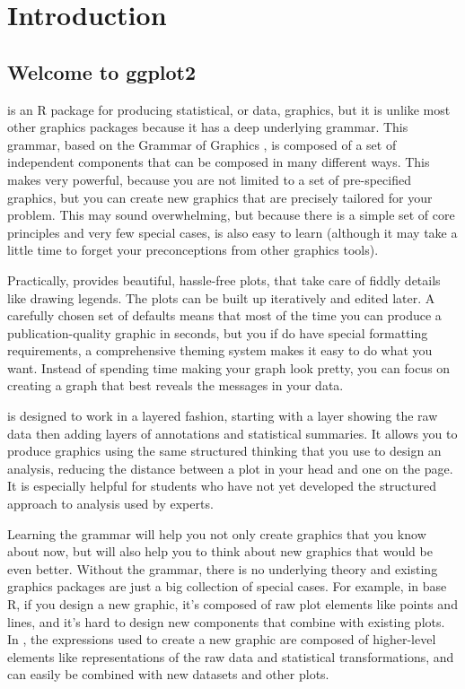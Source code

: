 

\chapter{Introduction}

\section{Welcome to ggplot2}

\ggplot is an R package for producing statistical, or data, graphics, but it is unlike most other graphics packages because it has a deep underlying grammar. This grammar, based on the Grammar of Graphics \citep{wilkinson:2006}, is composed of a set of independent components that can be composed in many different ways.  This makes \ggplot very powerful, because you are not limited to a set of pre-specified graphics, but you can create new graphics that are precisely tailored for your problem. This may sound overwhelming, but because there is a simple set of core principles and very few special cases, \ggplot is also easy to learn (although it may take a little time to forget your preconceptions from other graphics tools).

Practically, \ggplot provides beautiful, hassle-free plots, that take care of fiddly details like drawing legends.  The plots can be built up iteratively and edited later.  A carefully chosen set of defaults means that most of the time you can produce a publication-quality graphic in seconds, but you if do have special formatting requirements, a comprehensive theming system makes it easy to do what you want. Instead of spending time making your graph look pretty, you can focus on creating a graph that best reveals the messages in your data.

\ggplot is designed to work in a layered fashion, starting with a layer showing the raw data then adding layers of annotations and statistical summaries.  It allows you to produce graphics using the same structured thinking that you use to design an analysis, reducing the distance between a plot in your head and one on the page.  It is especially helpful for students who have not yet developed the structured approach to analysis used by experts.  

Learning the grammar will help you not only create graphics that you know about now, but will also help you to think about new graphics that would be even better.  Without the grammar, there is no underlying theory and existing graphics packages are just a big collection of special cases. For example, in base R, if you design a new graphic, it's composed of raw plot elements like points and lines, and it's hard to design new components that combine with existing plots.  In \ggplot, the expressions used to create a new graphic are composed of higher-level elements like representations of the raw data and statistical transformations, and can easily be combined with new datasets and other plots.

